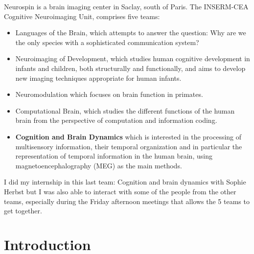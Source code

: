Neurospin is a brain imaging center in Saclay, south of Paris. The INSERM-CEA Cognitive Neuroimaging Unit, comprises five teams:

\begin{itemize}
    \item Languages of the Brain, which attempts to answer the question: Why are we the only species with a sophisticated communication system?
    \item Neuroimaging of Development, which studies human cognitive development in infants and children, both structurally and functionally, and aims to develop new imaging techniques appropriate for human infants.
    \item Neuromodulation which focuses on brain function in primates.
    \item Computational Brain, which studies the different functions of the human brain from the perspective of computation and information coding.
    \item \textbf{Cognition and Brain Dynamics} which is interested in the processing of multisensory information, their temporal organization and in particular the representation of temporal information in the human brain, using magnetoencephalography (MEG) as the main methods.
\end{itemize}

I did my internship in this last team: Cognition and brain dynamics with Sophie Herbst but I was also able to interact with some of the people from the other teams, especially during the Friday afternoon meetings that allows the 5 teams to get together.








\chapter*{Introduction}


